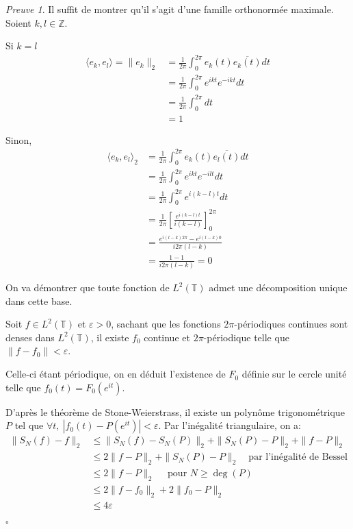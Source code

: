 \documentclass[]{article}
\theoremstyle{remark}
\newtheorem{myproof}{Preuve}
\theoremstyle{definition}
\newcommand{\cqfd}{
	\hfill$\square$
}
\begin{document}
			\begin{myproof}	
				
				Il suffit de montrer qu'il s'agit d'une famille orthonormée maximale.
				Soient $k, l \in \mathbb{Z}$.
				
				Si $k=l$
				\begin{align*}
					\langle e_k, e_l \rangle = \|e_k\|_2 &= \frac{1}{2\pi}\int_0^{2\pi} e_k(t)\overline{e_k(t)}dt\\
					&  =  \frac{1}{2\pi}\int_0^{2\pi} e^{ikt}e^{-ikt}dt\\
					& = \frac{1}{2\pi} \int_0^{2\pi} dt\\
					& = 1
				\end{align*}
				 
			
				Sinon, 
				\begin{align*}
				\langle e_k, e_l\rangle_2 & = \frac{1}{2\pi} \int_0^{2\pi} e_k(t) \overline{e_l(t)}dt 
				\\ & = \frac{1}{2\pi} \int_0^{2\pi}e^{ik t} e^{-il t} dt 
				\\ & = \frac{1}{{2\pi}} \int_0^{2\pi} e^{i(k-l)t} dt 
				\\ & = \frac{1}{{2\pi}}  \left[ \frac {e^{i(k-l) t}} {{i(k-l)}} \right] _0^{2\pi}
				\\ & = \frac {e^{i (l-k){2\pi}} - e^{i(l-k)  0}} {i {2\pi}(l-k)}
				\\ & = \frac {1 - 1}{i {2\pi}(l-k)} = 0
				\end{align*}

				On va démontrer que toute fonction de $L^2(\mathbb{T}) $ admet une décomposition unique dans cette base.
				
				Soit $f \in L^2(\mathbb{T})$ et $\varepsilon > 0$, sachant que les fonctions $2\pi$-périodiques continues sont denses dans $L^2(\mathbb{T})$, il existe $f_0$ continue et $2\pi$-périodique telle que $\| f - f_0\| < \varepsilon$. 
				
				Celle-ci étant périodique, on en déduit l'existence de $F_0$ définie sur le cercle unité telle que $f_0(t) = F_0(e^{it})$.
				
				D'après le théorème de Stone-Weierstrass, il existe un polynôme trigonométrique $P$ tel que $\forall t,  ~ |f_0(t) - P(e^{it})| < \varepsilon $.
				Par l'inégalité triangulaire, on a:
				\begin{align*}
					\| S_N(f) -f \|_2 &\leqslant \|S_N(f) - S_N(P)\|_2 + \| S_N(P) - P \|_2 + \| f- P \|_2 \\
				&	\leqslant 2 \| f - P\|_2 + \| S_N(P) - P\|_2 \quad \text{par l'inégalité de Bessel} \\
				& \leqslant 2 \| f - P\|_2 \quad \text{ pour } N\geqslant \deg(P) \\
				& \leqslant 2 \| f - f_0\|_2 + 2 \| f_0- P\|_2 \\
				& \leqslant 4 \varepsilon
				\end{align*}
				\cqfd
				
			\end{myproof}
			
\end{document}
